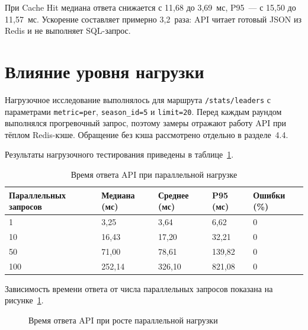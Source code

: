 При Cache Hit медиана ответа снижается с 11{,}68 до 3{,}69~мс,
P95~--- с 15{,}50 до 11{,}57~мс. Ускорение составляет примерно 3{,}2~раза:
API читает готовый JSON из Redis и не выполняет SQL-запрос.

\section{Влияние уровня нагрузки}

Нагрузочное исследование выполнялось для маршрута \texttt{/stats/leaders}
с параметрами \texttt{metric=per}, \texttt{season\_id=5} и \texttt{limit=20}.
Перед каждым раундом выполнялся прогревочный запрос, поэтому замеры отражают
работу API при тёплом Redis-кэше. Обращение без кэша рассмотрено отдельно
в разделе~4.4.

Результаты нагрузочного тестирования приведены в таблице~\ref{tab:load-warm}.

\begin{table}[H]
\caption{Время ответа API при параллельной нагрузке}
\label{tab:load-warm}
\centering
\small
\begin{tabular}{|p{}|p{}|p{}
  |p{}|p{}|}
\hline
\textbf{Параллельных запросов} & \textbf{Медиана (мс)}
  & \textbf{Среднее (мс)} & \textbf{P95 (мс)} & \textbf{Ошибки (\%)} \\
\hline
1   & 3{,}25   & 3{,}64   & 6{,}62   & 0 \\
\hline
10  & 16{,}43  & 17{,}20  & 32{,}21  & 0 \\
\hline
50  & 71{,}00  & 78{,}61  & 139{,}82 & 0 \\
\hline
100 & 252{,}14 & 326{,}10 & 821{,}08 & 0 \\
\hline
\end{tabular}
\end{table}

Зависимость времени ответа от числа параллельных запросов показана
на рисунке~\ref{fig:load-warm}.

\begin{figure}[H]
\centering
{}
\caption{Время ответа API при росте параллельной нагрузки}
\label{fig:load-warm}
\end{figure}

